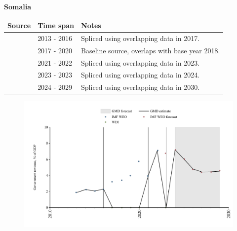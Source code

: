 \documentclass[12pt,a4paper,landscape]{article}
\begin{document}
\begin{adjustbox}{max totalsize={\paperwidth}{\paperheight},center}
\begin{minipage}[t][\textheight][t]{\textwidth}
\vspace*{0.5cm}
{}
\begin{center}
{\Large\bfseries Somalia}
\end{center}
\vspace{0.5cm}
\begin{table}[H]
\centering
\small
\begin{tabular}{|l|l|l|}
\hline
\textbf{Source} & \textbf{Time span} & \textbf{Notes} \\
\hline
\rowcolor{white}\cite{IMF_WEO}& 2013 - 2016 &Spliced using overlapping data in 2017.\\
\rowcolor{lightgray}\cite{WDI}& 2017 - 2020 &Baseline source, overlaps with base year 2018.\\
\rowcolor{white}\cite{IMF_WEO}& 2021 - 2022 &Spliced using overlapping data in 2023.\\
\rowcolor{lightgray}\cite{WDI}& 2023 - 2023 &Spliced using overlapping data in 2024.\\
\rowcolor{white}\cite{IMF_WEO_forecast}& 2024 - 2029 &Spliced using overlapping data in 2030.\\
\hline
\end{tabular}
\end{table}
\begin{figure}[H]
\centering
\includegraphics[width=\textwidth,height=0.6\textheight,keepaspectratio]{graphs/SOM_govrev_GDP.pdf}
\end{figure}
\end{minipage}
\end{adjustbox}
\end{document}
